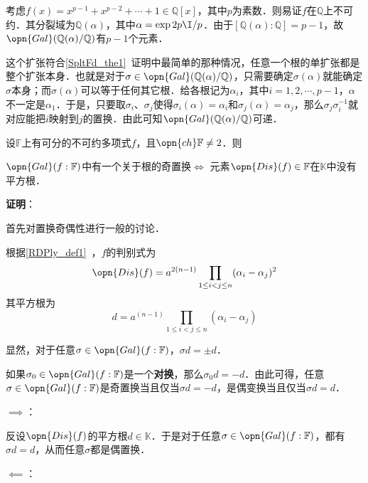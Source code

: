 \begin{example}{}
考虑$f(x)=x^{p-1}+x^{p-2}+\cdots+1\in\mathbb{Q}[x]$，其中$p$为素数．则易证$f$在$\mathbb{Q}$上不可约．其分裂域为$\mathbb{Q}(\alpha)$，其中$\alpha=\exp{2p\I/p}$．由于$[\mathbb{Q}(\alpha):\mathbb{Q}]=p-1$，故$\opn{Gal}(\mathbb{Q}(\alpha)/\mathbb{Q})$有$p-1$个元素．

这个扩张符合\autoref{SpltFd_the1}~证明中最简单的那种情况，任意一个根的单扩张都是整个扩张本身．也就是对于$\sigma\in\opn{Gal}(\mathbb{Q}(\alpha)/\mathbb{Q})$，只需要确定$\sigma(\alpha)$就能确定$\sigma$本身；而$\sigma(\alpha)$可以等于任何其它根．给各根记为$\alpha_i$，其中$i=1, 2, \cdots, p-1$，$\alpha$不一定是$\alpha_1$．于是，只要取$\sigma_i$、$\sigma_j$使得$\sigma_i(\alpha)=\alpha_i$和$\sigma_j(\alpha)=\alpha_j$，那么$\sigma_j\sigma_i^{-1}$就对应能把$i$映射到$j$的置换．由此可知$\opn{Gal}(\mathbb{Q}(\alpha)/\mathbb{Q})$可递．
\end{example}


\begin{theorem}{}
设$\mathbb{F}$上有可分的不可约多项式$f$，且$\opn{ch}\mathbb{F}\neq 2$．则

$\opn{Gal}(f:\mathbb{F})$中有一个关于根的奇置换$\iff$ 元素$\opn{Dis}(f)\in\mathbb{F}$在$\mathbb{K}$中没有平方根．
\end{theorem}

\textbf{证明}：

首先对置换奇偶性进行一般的讨论．

根据\autoref{RDPly_def1}~，$f$的判别式为
\begin{equation}
\opn{Dis}(f) = a^{2(n-1)}\prod_{1\leq i<j\leq n}(\alpha_i-\alpha_j)^2
\end{equation}
其平方根为
\begin{equation}
d = a^{(n-1)}\prod_{1\leq i<j\leq n}(\alpha_i-\alpha_j)
\end{equation}

显然，对于任意$\sigma\in\opn{Gal}(f:\mathbb{F})$，$\sigma d=\pm d$．

如果$\sigma_0\in\opn{Gal}(f:\mathbb{F})$是一个\textbf{对换}，那么$\sigma_0 d=-d$．由此可得，任意$\sigma\in\opn{Gal}(f:\mathbb{F})$是奇置换当且仅当$\sigma d=-d$，是偶变换当且仅当$\sigma d=d$．

$\implies$：

反设$\opn{Dis}(f)$的平方根$d\in\mathbb{K}$．于是对于任意$\sigma\in\opn{Gal}(f:\mathbb{F})$，都有$\sigma d = d$，从而任意$\sigma$都是偶置换．

$\impliedby$：

